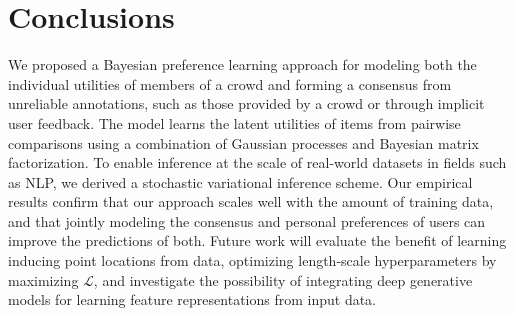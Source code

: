 \section{Conclusions}

We proposed a Bayesian preference learning approach 
for modeling both the individual utilities of members of a crowd 
and forming a consensus from 
unreliable annotations, such as those provided by a crowd or through implicit user feedback.
The model learns the latent utilities of items from pairwise comparisons using a combination of Gaussian processes and Bayesian matrix factorization.
To enable inference at the scale of real-world datasets in fields such as NLP,
we derived a stochastic variational inference scheme.
Our empirical results confirm that our approach scales well with the amount of training data,
and that jointly modeling the consensus and personal preferences of users can improve the predictions
of both.
Future work will evaluate the benefit of learning inducing point locations from data,
optimizing length-scale hyperparameters by maximizing $\mathcal L$,
and investigate the possibility of integrating deep generative models 
for learning feature representations from input data.
